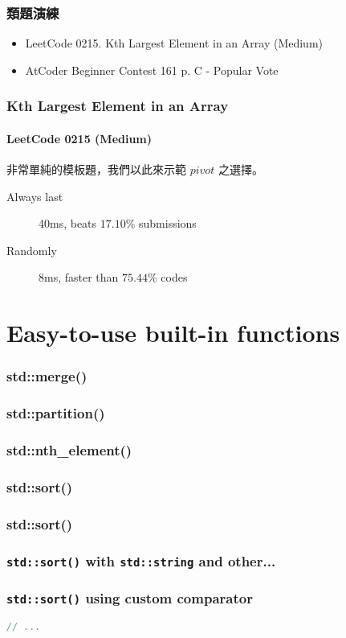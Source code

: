 \documentclass{beamer}
\begin{document}
\frame
{
	\frametitle{類題演練}
	
	\begin{itemize}
		\item LeetCode 0215. Kth Largest Element in an Array (Medium)
		\item AtCoder Beginner Contest 161 p. C - Popular Vote
	\end{itemize}
}

\frame
{
	\frametitle{Kth Largest Element in an Array}
	\framesubtitle{LeetCode 0215 (Medium)}
	
	非常單純的模板題，我們以此來示範 $pivot$ 之選擇。
	
	\begin{description}
		\item[Always last] 40ms, beats $17.10\%$ submissions
		\item[Randomly] 8ms, faster than $75.44\%$ codes
	\end{description}
}

\section{Easy-to-use built-in functions}

\frame
{
	\frametitle{\ttfamily std::merge()}
	
	\small
	
}

\frame
{
	\frametitle{\ttfamily std::partition()}
	
	\small
	
}

\frame
{
	\frametitle{\ttfamily std::nth\_element()}
	
	
}

\subsubsection{std::sort()}

\frame
{
	\frametitle{\ttfamily std::sort()}
	
	
}

\frame
{
	\frametitle{\texttt{std::sort()} with \texttt{std::string} and other...}
	
	
}

\begin{frame}[fragile]
	\frametitle{\texttt{std::sort()} using custom comparator}
	
	\small
	
	\begin{lstlisting}[language=C++]
// ...
    \end{lstlisting}
	
\end{frame}
\end{document}
